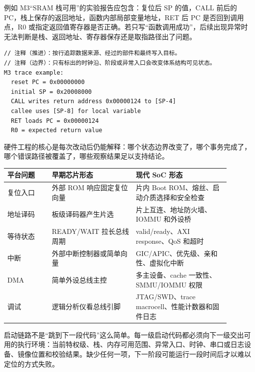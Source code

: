 例如 M3“SRAM 栈可用”的实验报告应包含：复位后 SP 的值，CALL 前后的 PC，栈上保存的返回地址，函数内部局部变量地址，RET 后 PC 是否回到调用点，R0 或指定返回值寄存器是否正确。若只写“函数调用成功”，后续出现异常时无法判断是栈、返回地址、寄存器保存还是取指路径出了问题。

\begin{lstlisting}
// 注释（推进）：按行追踪数据来源、经过的部件和最终写入目标。
// 注释（边界）：只有标出的时钟沿、阶段或异常入口会改变体系结构可见状态。
M3 trace example:
  reset PC = 0x00000000
  initial SP = 0x20008000
  CALL writes return address 0x00000124 to [SP-4]
  callee uses [SP-8] for local variable
  RET loads PC = 0x00000124
  R0 = expected return value
\end{lstlisting}

硬件工程的核心是每次改动后仍能解释：哪个状态边界改变了，哪个事务完成了，哪个错误路径被覆盖了，哪些观察结果足以支持结论。


\begin{longtable}{L{0.18\linewidth}L{0.34\linewidth}L{0.38\linewidth}}
\toprule
平台问题 & 早期芯片形态 & 现代 SoC 形态 \\
\midrule
复位入口 & 外部 ROM 响应固定复位向量 & 片内 Boot ROM、熔丝、启动介质选择和安全检查 \\\tablerowrule
地址译码 & 板级译码器产生片选 & 片上互连、地址防火墙、IOMMU 和外设桥 \\\tablerowrule
等待状态 & READY/WAIT 拉长总线周期 & valid/ready、AXI response、QoS 和超时 \\\tablerowrule
中断 & 外部中断控制器或简单向量 & GIC/APIC、优先级、亲和性、虚拟化中断 \\\tablerowrule
DMA & 简单外设总线主控 & 多主设备、cache 一致性、SMMU/IOMMU 权限 \\\tablerowrule
调试 & 逻辑分析仪看总线引脚 & JTAG/SWD、trace macrocell、性能计数器和固件日志 \\
\bottomrule
\end{longtable}

启动链路不是“跳到下一段代码”这么简单。每一级启动代码都必须向下一级交出可用的执行环境：当前特权级、栈、内存可用范围、异常入口、时钟、串口或日志设备、镜像位置和校验结果。缺少任何一项，下一阶段可能运行一段时间后才以难以定位的方式失败。

